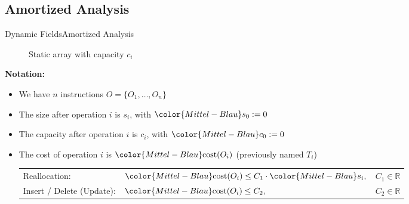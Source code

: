 \subsection{Amortized Analysis}

\begin{frame}{Dynamic Fields}{Amortized Analysis}
  \vspace*{-1.0em}
  \begin{figure}[!t]%
    \def\FSAsize{16}\def\FSAelements{11}%
    \def\FSAcopy{0}\def\FSAdelete{0}\def\FSAinsert{0}%
    \def \FSAcopyarrow{1}%
    \def\FSAlabelsize{Size ${\color{Mittel-Blau}s_i}$}%
    \def\FSAlabelcapacity{Capacity ${\color{Mittel-Blau}c_i}$}%
    \vspace*{-0.5em}%
    \caption{Static array with capacity $c_i$}%
    \label{fig:array_amortized analysis}%
  \end{figure}%
  \vspace*{-1.0em}
  \textbf{Notation:}%
  \begin{itemize}%
    \item
      We have $n$ instructions $O = \{O_1,\dots,O_n\}$
    \item
      The {\color{Mittel-Blau}size} after operation $i$ is
      {\color{Mittel-Blau}$s_i$},
      with ${\color{Mittel-Blau}s_0} := 0$
    \item
      The {\color{Mittel-Blau}capacity} after operation $i$ is
      {\color{Mittel-Blau}$c_i$},
      with ${\color{Mittel-Blau}c_0} := 0$
    \item
      The {\color{Mittel-Blau}cost} of operation $i$ is
      ${\color{Mittel-Blau}\mathrm{cost}(O_i)}$
      (previously named $T_i$)\\[0.5em]
      \begin{tabular}{lll}
        Reallocation: &
        ${\color{Mittel-Blau}\mathrm{cost}(O_i)}
          \leq C_1 \cdot {\color{Mittel-Blau}s_i},$ &
        $C_1 \in \mathbb{R}$\\
        Insert / Delete (Update): &
        ${\color{Mittel-Blau}\mathrm{cost}(O_i)}
          \leq C_2,$ &
        $C_2 \in \mathbb{R}$
      \end{tabular}
  \end{itemize}
\end{frame}



